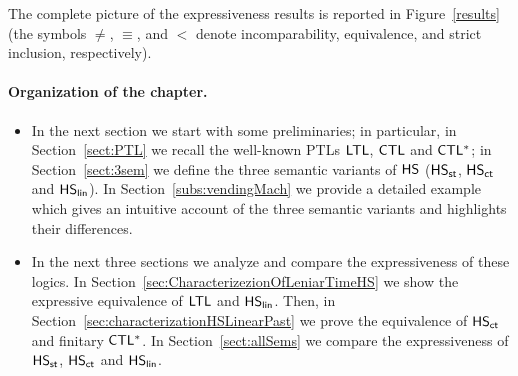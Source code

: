 The complete picture of the expressiveness results is reported in Figure~\ref{results}
(the symbols $\neq$, $\equiv$, and $<$ denote incomparability, equivalence, and strict %
inclusion, respectively).

\paragraph*{Organization of the chapter.}
\begin{itemize}
	\item In the next section we start with some preliminaries; in particular, in Section~\ref{sect:PTL} we recall the well-known PTLs $\text{\sffamily LTL}$, $\text{\sffamily CTL}$ and $\text{\sffamily CTL$^{*}$}$; in Section~\ref{sect:3sem} we define the three semantic variants of $\text{\sffamily HS}$ ($\text{\sffamily HS}_{\mathsf{st}}$, $\text{\sffamily HS}_{\mathsf{ct}}$ and $\text{\sffamily HS}_{\mathsf{lin}}$). In Section~\ref{subs:vendingMach} we provide a detailed example which gives an intuitive account of the three semantic variants and highlights their differences.
	\item In the next three sections we analyze and compare the expressiveness of these logics.  
In Section~\ref{sec:CharacterizezionOfLeniarTimeHS} we show the expressive equivalence of $\text{\sffamily LTL}$ and $\text{\sffamily HS}_{\mathsf{lin}}$. Then, in Section~\ref{sec:characterizationHSLinearPast} we prove the equivalence of $\text{\sffamily HS}_{\mathsf{ct}}$ and finitary $\text{\sffamily CTL$^{*}$}$. In Section~\ref{sect:allSems} we compare the expressiveness of 
$\text{\sffamily HS}_{\mathsf{st}}$, $\text{\sffamily HS}_{\mathsf{ct}}$ and $\text{\sffamily HS}_{\mathsf{lin}}$.
\end{itemize}
